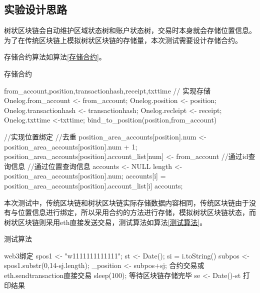 \subsection{实验设计思路}
树状区块链会自动维护区域状态树和账户状态树，交易时本身就会存储位置信息。为了在传统区块链上模拟树状区块链的存储量，本次测试需要设计存储合约。

存储合约算法如算法\ref{存储合约}。
\begin{algorithm}[t]
    \caption{存储合约} %
    \label{存储合约}
    \begin{algorithmic}[1] %
        \Require from\_account,position,transactionhash,receipt,txttime
            // 实现存储  
            \State  Onelog.from\_account <- from\_account;
            \State  Onelog.position <- position;
            \State  Onelog.transactionhash <- transactionhash;
            \State  Onelog.recleipt <- receipt;
            \State  Onelog.txttime <-txttime;
            \State  bind\_to\_position(position,from\_account)
        \EndFunction  

          //实现位置绑定 
            //去重
            {
                \Return
            }
            \Else
                \State position\_area\_accounts[position].num <- position\_area\_accounts[position].num + 1;
                \State position\_area\_accounts[position].account\_list[num] <- from\_account
            \EndIf
        \EndFunction  
          //通过id查询信息
        \EndFunction  
          //通过位置查询信息
            \State accounts <- NULL
            \State length <-  position\_area\_accounts[position].num;
                \State accounts[i] = position\_area\_accounts[position].account\_list[i]
            \EndFor 
            \Return accounts;
        \EndFunction
    \end{algorithmic}  
\end{algorithm}

本次测试中，传统区块链和树状区块链实际存储数据内容相同，传统区块链由于没有与位置信息进行绑定，所以采用合约的方法进行存储，模拟树状区块链状态，而树状区块链则采用eth直接发送交易，测试算法如算法\ref{测试算法}。
\begin{algorithm}[t]
    \caption{测试算法} %
    \label{测试算法}
    \begin{algorithmic}[1] %
       \State web3绑定
       \State spos1 <- "w1111111111111";
       \State st <- Date();
            \State si = i.toString()
            \State subpos <- spos1.substr(0,14-sj.length);
            \State \_position <- subpos+sj;
            \State 合约交易或eth.sendtransaction直接交易
            \State sleep(100);
       \EndFor
       \State 等待区块链存储完毕
       \State se <- Date()-st
       \State 打印结果
    \end{algorithmic}  
\end{algorithm}
